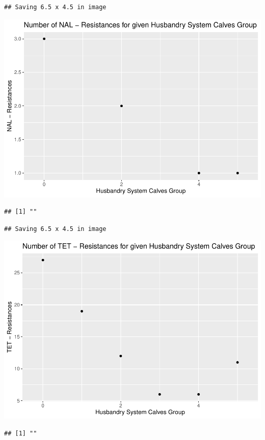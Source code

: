 \documentclass[
]{article}
\begin{document}
\begin{verbatim}
## Saving 6.5 x 4.5 in image
\end{verbatim}

\includegraphics{NResistenzen_files/figure-latex/binary_or_nominal_variables-37.pdf}

\begin{verbatim}
## [1] ""
\end{verbatim}

\begin{verbatim}
## Saving 6.5 x 4.5 in image
\end{verbatim}

\includegraphics{NResistenzen_files/figure-latex/binary_or_nominal_variables-38.pdf}

\begin{verbatim}
## [1] ""
\end{verbatim}
\end{document}
